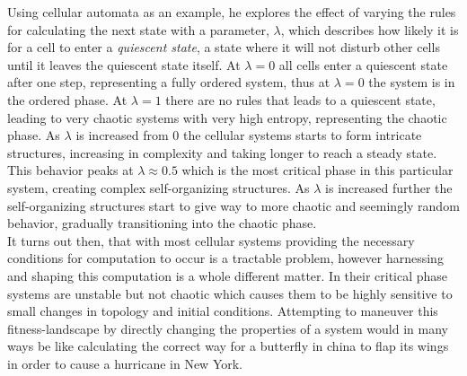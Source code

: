 Using cellular automata as an example, he explores the effect of varying the
rules for calculating the next state with a parameter, $\lambda$, which
describes how likely it is for a cell to enter a \textit{quiescent state}, a state
where it will not disturb other cells until it leaves the quiescent state itself.
At $\lambda = 0$ all cells enter a quiescent state after one step, representing
a fully ordered system, thus at $\lambda = 0$ the system is in the ordered phase.
At $\lambda = 1$ there are no rules that leads to a quiescent state, leading to
very chaotic systems with very high entropy, representing the chaotic phase.
As $\lambda$ is increased from 0 the cellular systems starts to form intricate
structures, increasing in complexity and taking longer to reach a steady state.
This behavior peaks at $\lambda \approx 0.5$ which is the most critical phase in this
particular system, creating complex self-organizing structures.
As $\lambda$ is increased further the self-organizing structures start to give
way to more chaotic and seemingly random behavior, gradually transitioning into
the chaotic phase.\\
It turns out then, that with most cellular systems providing the necessary
conditions for computation to occur is a tractable problem, however harnessing
and shaping this computation is a whole different matter.
In their critical phase systems are unstable but not chaotic which causes them to
be highly sensitive to small changes in topology and initial conditions.
Attempting to maneuver this fitness-landscape by directly changing the
properties of a system would in many ways be like calculating the correct way
for a butterfly in china to flap its wings in order to cause a hurricane in New York.\\
